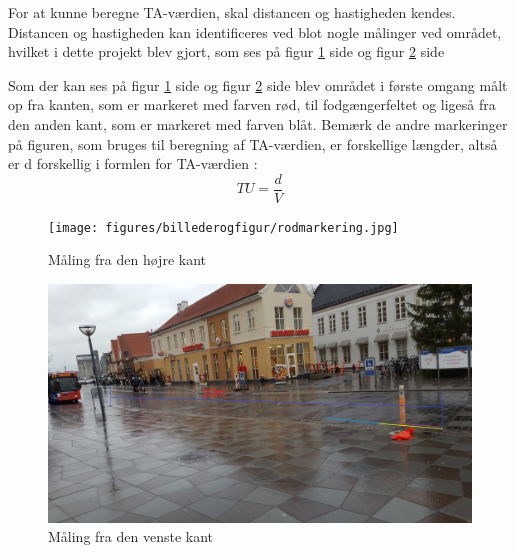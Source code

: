 For at kunne beregne TA-værdien, skal distancen og hastigheden kendes. Distancen og hastigheden kan identificeres ved blot nogle målinger ved området, hvilket i dette projekt blev gjort, som ses på figur \cref{fig:obsomrrod} side \pageref{fig:obsomrrod} og figur \cref{fig:obsomrbla} side \pageref{fig:obsomrbla}

Som der kan ses på figur \cref{fig:obsomrrod} side \pageref{fig:obsomrrod} og figur \cref{fig:obsomrbla} side \pageref{fig:obsomrbla}
blev området i første omgang målt op fra kanten, som er markeret med farven rød, til fodgængerfeltet og ligeså fra den anden kant, som er markeret med farven blåt. Bemærk de andre markeringer på figuren, som bruges til beregning af TA-værdien, er forskellige længder, altså er d forskellig i formlen for TA-værdien : $$ TU=\frac{d}{V} $$

\begin{figure}[htbp]
   \centering
   \begin{adjustbox}{max width=\textwidth}
     \texttt{[image: figures/billederogfigur/rodmarkering.jpg]}
  \end{adjustbox}
   \caption{Måling fra den højre kant}
   \label{fig:obsomrrod}
 \end{figure}

 \begin{figure}[htbp]
    \centering
    \begin{adjustbox}{max width=\textwidth}
      \includegraphics[scale=0.3]{figures/billederogfigur/blaamarkering.jpg}
   \end{adjustbox}
    \caption{Måling fra den venste kant}
    \label{fig:obsomrbla}
  \end{figure}


